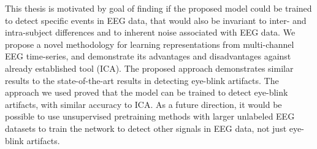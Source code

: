 \documentclass[12pt,a4paper,titlepage,openany]{report}
\begin{document}
This thesis is motivated by goal of finding if the proposed model could be trained to detect specific events in EEG data, that would also be invariant to inter- and intra-subject differences and to inherent noise associated with EEG data. We propose a novel methodology for learning representations from multi-channel EEG time-series, and demonstrate its advantages and disadvantages against already established tool (ICA). The proposed approach demonstrates similar results to the state-of-the-art results in detecting eye-blink artifacts. The approach we used proved that the model can be trained to detect eye-blink artifacts, with similar accuracy to ICA.
As a future direction, it would be possible to use unsupervised pretraining methods with larger unlabeled EEG datasets to train the network to detect other signals in EEG data, not just eye-blink artifacts.


\end{document}
